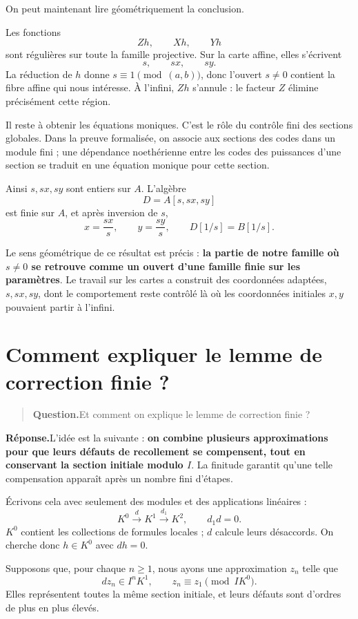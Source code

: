 \documentclass[11pt,a4paper]{article}
\newcommand{\question}[1]{\begin{quote}\textbf{Question.}\enspace #1\end{quote}}
\newcommand{\reponse}{\noindent\textbf{Réponse.}\enspace}
\begin{document}
On peut maintenant lire géométriquement la conclusion.

Les fonctions
\[
 Zh,\qquad Xh,\qquad Yh
\]
sont régulières sur toute la famille projective. Sur la carte affine,
elles s'écrivent
\[
 s,\qquad sx,\qquad sy.
\]
La réduction de $h$ donne $s\equiv1\pmod{(a,b)}$, donc l'ouvert $s\neq0$
contient la fibre affine qui nous intéresse. À l'infini, $Zh$ s'annule :
le facteur $Z$ élimine précisément cette région.

Il reste à obtenir les équations moniques. C'est le rôle du contrôle
fini des sections globales. Dans la preuve formalisée, on associe aux
sections des codes dans un module fini ; une dépendance noethérienne
entre les codes des puissances d'une section se traduit en une équation
monique pour cette section.

Ainsi $s,sx,sy$ sont entiers sur $A$. L'algèbre
\[
 D=A[s,sx,sy]
\]
est finie sur $A$, et après inversion de $s$,
\[
 x=\frac{sx}{s},\qquad y=\frac{sy}{s},
 \qquad D[1/s]=B[1/s].
\]

Le sens géométrique de ce résultat est précis : \textbf{la partie de
notre famille où $s\neq0$ se retrouve comme un ouvert d'une famille
finie sur les paramètres}. Le travail sur les cartes a construit des
coordonnées adaptées, $s,sx,sy$, dont le comportement reste contrôlé là
où les coordonnées initiales $x,y$ pouvaient partir à l'infini.

\section{Comment expliquer le lemme de correction finie ?}

\question{Et comment on explique le lemme de correction finie ?}

\reponse L'idée est la suivante : \textbf{on combine plusieurs
approximations pour que leurs défauts de recollement se compensent,
tout en conservant la section initiale modulo $I$}. La finitude garantit
qu'une telle compensation apparaît après un nombre fini d'étapes.

Écrivons cela avec seulement des modules et des applications linéaires :
\[
 K^0\xrightarrow{d}K^1\xrightarrow{d_1}K^2,
 \qquad d_1d=0.
\]
$K^0$ contient les collections de formules locales ; $d$ calcule leurs
désaccords. On cherche donc $h\in K^0$ avec $dh=0$.

Supposons que, pour chaque $n\geq1$, nous ayons une approximation $z_n$
telle que
\[
 dz_n\in I^nK^1,\qquad z_n\equiv z_1\pmod{IK^0}.
\]
Elles représentent toutes la même section initiale, et leurs défauts
sont d'ordres de plus en plus élevés.
\end{document}

